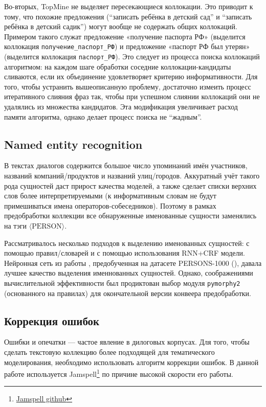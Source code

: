 Во-вторых, TopMine не выделяет пересекающиеся коллокации. Это приводит к тому, что похожие предложения (``записать ребёнка в детский сад'' и ``записать ребёнка в детский садик'') могут вообще не содержать общих коллокаций. Примером такого служат предложение «получение паспорта РФ» (выделится коллокация \texttt{получение\_паспорт\_РФ}) и предложение «паспорт РФ был утерян» (выделится коллокация \texttt{паспорт\_РФ}). Это следует из процесса поиска коллокаций алгоритмом: на каждом шаге обработки соседние коллокации-кандидаты сливаются, если их объединение удовлетворяет критерию информативности. Для того, чтобы устранить вышеописанную проблему, достаточно измеить процесс итеративного слияния фраз так, чтобы при успешном слиянии коллокаций они не удалялись из множества кандидатов. Эта модификация увеличивает расход памяти алгоритма, однако делает процесс поиска не ``жадным''.

\subsection{Named entity recognition}

\par В текстах диалогов содержится большое число упоминаний имён участников, названий компаний/продуктов и названий улиц/городов. Аккуратный учёт такого рода сущностей даст прирост качества моделей, а также сделает списки верхних слов более интерпретируемыми (к информативным словам не будут примешиваться имена операторов-собеседников).
Поэтому в рамках предобработки коллекции все обнаруженные именованные сущности заменялись на тэги $\langle \mathrm{PERSON} \rangle$.

Рассматривалось несколько подходов к выделению именованных сущностей: с помощью правил/словарей и с помощью использования RNN+CRF модели. 
Нейронная сеть из работы \cite{burtsev}, предобученная на датасете PERSONS-1000 (\cite{persona}), давала лучшее качество выделения именнованных сущностей. Однако, соображениями вычислительной эффективности был продиктован выбор модуля \texttt{pymorphy2} (основанного на правилах) для окончательной версии конвеера предобработки.

\subsection{Коррекция ошибок}

\par Ошибки и опечатки --- частое явление в дилоговых корпусах. Для того, чтобы сделать текстовую коллекцию более подходящей для тематического моделирования, необходимо использовать алгоритм коррекции ошибок. В данной работе используется Jamspell\footnote{\href{https://github.com/bakwc/JamSpell}{Jamspell github}} по причине высокой скорости его работы.

